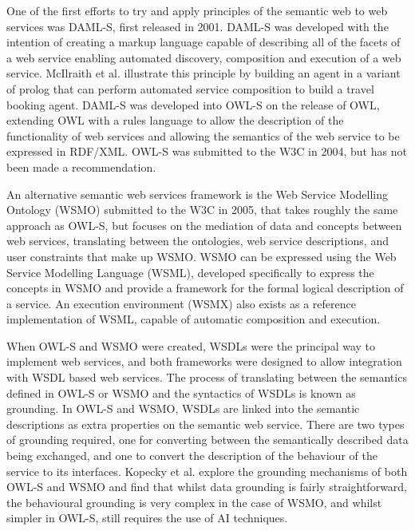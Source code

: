 One of the first efforts to try and apply principles of the semantic web to web
services was DAML-S, first released in 2001. DAML-S was developed with the
intention of creating a markup language capable of describing all of the facets
of a web service enabling automated discovery, composition and execution of a
web service. McIlraith et al. illustrate this principle by building an agent in
a variant of prolog that can perform automated service composition to build a
travel booking agent\cite{mcilraith_semantic_2001}. DAML-S was developed into
OWL-S on the release of OWL, extending OWL with a rules language to allow
the description of the functionality of web services and allowing the semantics
of the web service to be expressed in RDF/XML. OWL-S was submitted to the W3C in
2004, but has not been made a recommendation.

An alternative semantic web services framework is the Web Service Modelling
Ontology (WSMO) submitted to the W3C in 2005, that takes roughly the same
approach as OWL-S, but focuses on the mediation of data and concepts between
web services, translating between the ontologies, web service descriptions, and
user constraints that make up WSMO. WSMO can be expressed using the Web Service
Modelling Language (WSML), developed specifically to express the concepts in WSMO and
provide a framework for the formal logical description of a service. An
execution environment (WSMX) also exists as a reference implementation of WSML,
capable of automatic composition and execution.

When OWL-S and WSMO were created, WSDLs were the principal way to implement web
services, and both frameworks were designed to allow integration with WSDL based
web services\cite{martin_bringing_2007-1}\cite{roman_web_2005}. 
The process of translating between the semantics defined
in OWL-S or WSMO and the syntactics of WSDLs is known as grounding. In
OWL-S and WSMO, WSDLs are linked into the semantic descriptions as extra
properties on the semantic web service. There are two types of grounding
required, one for converting between the semantically described data being
exchanged, and one to convert the description of the behaviour of the service to
its interfaces. Kopecky et al. explore the grounding mechanisms of both OWL-S
and WSMO and find that whilst data grounding is fairly straightforward, the
behavioural grounding is very complex in the case of WSMO, and whilst simpler in
OWL-S, still requires the use of AI techniques\cite{kopecky_semantic_2006}.

